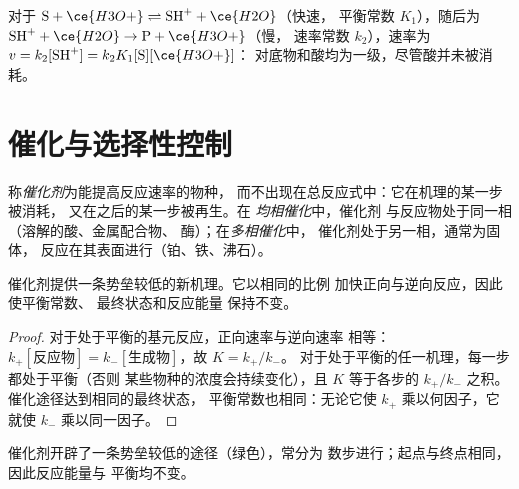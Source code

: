 \begin{example}[酸催化反应]\label{ex:b1:elementary-steps:acid}
对于 $\mathrm{S} + \ce{H3O+} \rightleftharpoons \mathrm{SH}^+ + \ce{H2O}$（快速，
平衡常数 $K_1$），随后为 $\mathrm{SH}^+ + \ce{H2O} \to \mathrm{P} + \ce{H3O+}$（慢，
速率常数 $k_2$），速率为 $v = k_2[\mathrm{SH}^+] = k_2K_1[\mathrm{S}][\ce{H3O+}]$：
对底物和酸均为一级，尽管酸并未被消耗。
\end{example}

\section{催化与选择性控制}

\begin{definition}\label{def:b1:elementary-steps:catalyst}
称\emph{催化剂}为能提高反应速率的物种，
而不出现在总反应式中：它在机理的某一步被消耗，
又在之后的某一步被再生。在
\emph{均相催化}中，催化剂
与反应物处于同一相（溶解的酸、金属配合物、
酶）；在\emph{多相催化}中，
催化剂处于另一相，通常为固体，
反应在其表面进行（铂、铁、沸石）。
\end{definition}

\begin{proposition}[催化剂改变什么]\label{prop:b1:elementary-steps:catalysis}
催化剂提供一条势垒较低的新机理。它以相同的比例
加快正向与逆向反应，因此使平衡常数、
最终状态和反应能量
保持不变。
\end{proposition}

\begin{proof}
对于处于平衡的基元反应，正向速率与逆向速率
相等：$k_+[\text{反应物}] = k_-[\text{生成物}]$，故 $K = k_+/k_-$。
对于处于平衡的任一机理，每一步都处于平衡（否则
某些物种的浓度会持续变化），且 $K$ 等于各步的
$k_+/k_-$ 之积。催化途径达到相同的最终状态，
平衡常数也相同：无论它使 $k_+$ 乘以何因子，它就使 $k_-$
乘以同一因子。
\end{proof}

\begin{omfigure}

{\small 催化剂开辟了一条势垒较低的途径（绿色），常分为
数步进行；起点与终点相同，因此反应能量与
平衡均不变。}
\end{omfigure}

